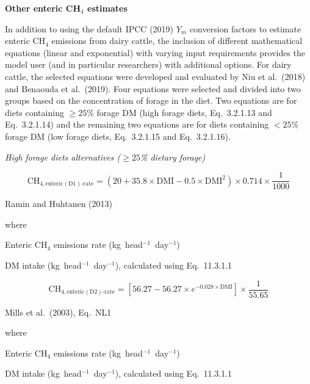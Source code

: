\bigskip
\noindent\textbf{Other enteric CH$_4$ estimates}

In addition to using the default IPCC (2019) $Y_m$ conversion factors to estimate
enteric CH$_4$ emissions from dairy cattle, the inclusion of different mathematical
equations (linear and exponential) with varying input requirements provides the model
user (and in particular researchers) with additional options. For dairy cattle, the
selected equations were developed and evaluated by Niu et al.\ (2018) and Benaouda
et al.\ (2019). Four equations were selected and divided into two groups based on the
concentration of forage in the diet. Two equations are for diets containing $\geq 25$\%
forage DM (high forage diets, Eq.~3.2.1.13 and Eq.~3.2.1.14) and the remaining two
equations are for diets containing $< 25$\% forage DM (low forage diets,
Eq.~3.2.1.15 and Eq.~3.2.1.16).

\noindent\textit{High forage diets alternatives ($\geq 25$\% dietary forage)}

\begin{equation}
    \mathrm{CH}_{4,\mathrm{enteric}(\mathrm{D1})\mathrm{\text{-}rate}} =
        \left(20 + 35.8 \times \mathrm{DMI}
            - 0.5 \times \mathrm{DMI}^{2}\right)
        \times 0.714 \times \frac{1}{1000}
    \tag{Eq.\ 3.2.1.13}
\end{equation}

\noindent Ramin and Huhtanen (2013)

\noindent where
\begin{description}[font=\normalfont, leftmargin=9em, style=sameline, nosep]
    \item[$\mathrm{CH}_{4,\mathrm{enteric}(\mathrm{D1})\mathrm{\text{-}rate}}$]
          Enteric CH$_4$ emissions rate (kg~head$^{-1}$~day$^{-1}$)
    \item[$\mathrm{DMI}$] DM intake (kg~head$^{-1}$~day$^{-1}$), calculated using
          Eq.~11.3.1.1
\end{description}

\begin{equation}
    \mathrm{CH}_{4,\mathrm{enteric}(\mathrm{D2})\mathrm{\text{-}rate}} =
        \left[56.27 - 56.27 \times e^{-0.028 \times \mathrm{DMI}}\right]
        \times \frac{1}{55.65}
    \tag{Eq.\ 3.2.1.14}
\end{equation}

\noindent Mills et al.\ (2003), Eq.~NL1

\noindent where
\begin{description}[font=\normalfont, leftmargin=9em, style=sameline, nosep]
    \item[$\mathrm{CH}_{4,\mathrm{enteric}(\mathrm{D2})\mathrm{\text{-}rate}}$]
          Enteric CH$_4$ emissions rate (kg~head$^{-1}$~day$^{-1}$)
    \item[$\mathrm{DMI}$] DM intake (kg~head$^{-1}$~day$^{-1}$), calculated using
          Eq.~11.3.1.1
\end{description}

